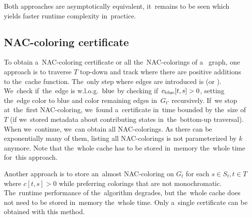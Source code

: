 Both approaches are asymptotically equivalent,
it~remains to be seen which yields faster runtime complexity in~practice.



\subsection{NAC-coloring certificate}

To obtain a~NAC-coloring certificate or all the~NAC-colorings of a~ graph,
one approach is to traverse \( T \) top-down
and track where there are positive additions to the~cache function.
%
The~only step where edges are introduced is \IntroduceEdgeNode{}
(or \IntroduceVertexWithEdgesNode{}).
We~check if~the~edge is w.l.o.g.\ \( \text{blue} \) by checking if~\( c_{\text{blue}}[t,s] > 0 \),
setting the~edge color to blue and color remaining edges in~\( G_{t'} \) recursively.
If~we stop at~the~first NAC-coloring, we~found a~certificate in~time bounded by
the~size of \( T \)
(if we~stored metadata about contributing states in~the~bottom-up traversal).
%
When we~continue, we~can obtain all NAC-colorings.
As there can be exponentially many of them,
listing all NAC-colorings is not parameterized by \( k \) anymore.
Note that the~whole cache has to be stored in~memory
the~whole time for~this approach.

Another approach is to store an~almost NAC-coloring on \( G_t \)
for each \( s \in S_t, t \in T \) where \( c[t, s] > 0 \)
while preferring colorings that are not monochromatic.
The~runtime performance of the~algorithm degrades,
but the~whole cache does not need to be stored in~memory the~whole time.
Only a~single certificate can be obtained with this method.


%

